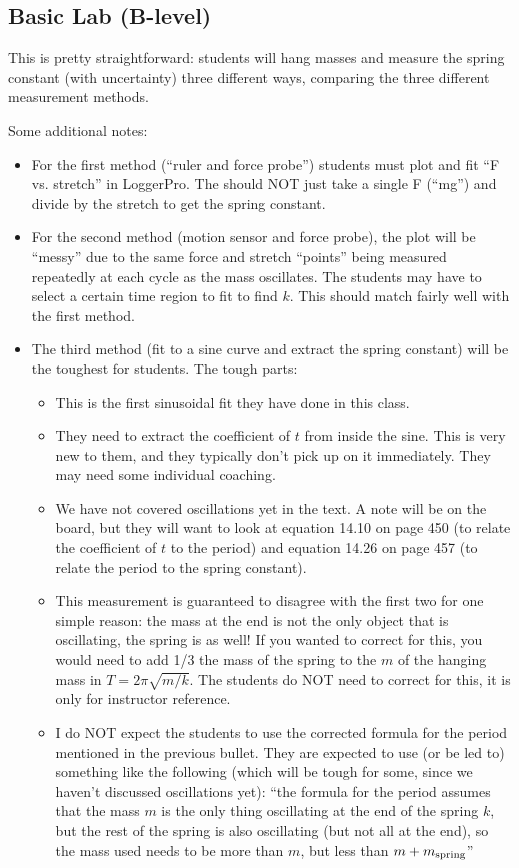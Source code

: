 \documentclass[fleqn,letterpaper]{article}
\begin{document}
\subsection*{Basic Lab (B-level)}

This is pretty straightforward: students will hang masses and measure the spring constant (with uncertainty) three different ways, comparing the three different measurement methods.

Some additional notes:

\begin{itemize}
\item{For the first method (``ruler and force probe'') students must plot and fit ``F vs. stretch'' in LoggerPro.  The should NOT just take a single F (``mg'') and divide by the stretch to get the spring constant.}
\item{For the second method (motion sensor and force probe), the plot will be ``messy'' due to the same force and stretch ``points'' being measured repeatedly at each cycle as the mass oscillates.  The students may have to select a certain time region to fit to find $k$.  This should match fairly well with the first method.}
\item{The third method (fit to a sine curve and extract the spring constant) will be the toughest for students. The tough parts:
  \begin{itemize}
   \item{This is the first sinusoidal fit they have done in this class.}
   \item{They need to extract the coefficient of $t$ from inside the sine.  This is very new to them, and they typically don't pick up on it immediately.  They may need some individual coaching.}
   \item{We have not covered oscillations yet in the text.  A note will be on the board, but they will want to look at equation 14.10 on page 450 (to relate the coefficient of $t$ to the period) and equation 14.26 on page 457 (to relate the period to the spring constant).}
   \item{This measurement is guaranteed to disagree with the first two for one simple reason: the mass at the end is not the only object that is oscillating, the spring is as well!  If you wanted to correct for this, you would need to add 1/3 the mass of the spring to the $m$ of the hanging mass in $T = 2\pi \sqrt{m/k}$.  The students do NOT need to correct for this, it is only for instructor reference.}
   \item{I do NOT expect the students to use the corrected formula for the period mentioned in the previous bullet.  They are expected to use (or be led to) something like the following (which will be tough for some, since we haven't discussed oscillations yet):  ``the formula for the period assumes that the mass $m$ is the only thing oscillating at the end of the spring $k$, but the rest of the spring is also oscillating (but not all at the end), so the mass used needs to be more than $m$, but less than $m + m_{\rm spring}$''}

\end{itemize}}
\end{itemize}
\end{document}
